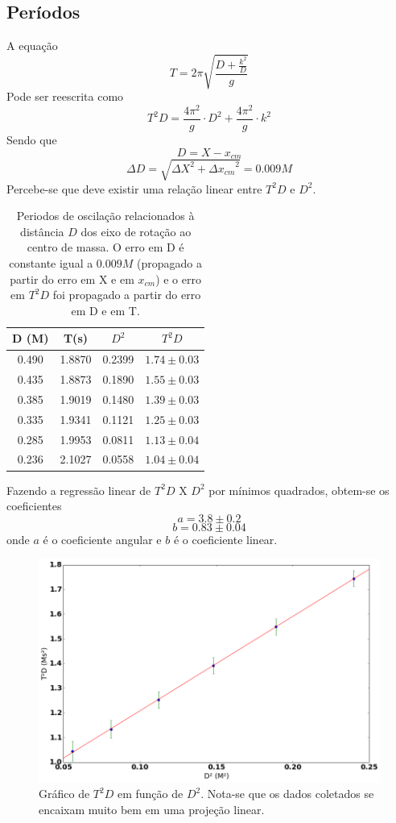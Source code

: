 \documentclass[12pt,a4paper]{article}
\begin{document}
\subsection{Períodos}
A equação $$ T = 2\pi\sqrt{\frac{D + \frac{k^2}{D}}{g}} $$ 
Pode ser reescrita como 
\begin{equation} \label{eq:funcao}
 T^2D = \frac{4\pi^2}{g} \cdot D^2 + \frac{4\pi^2}{g} \cdot k^2 
\end{equation}
Sendo que $$D = X - x_{cm} $$ 
$$ \Delta D = \sqrt{{\Delta X}^2 + {\Delta x_{cm}}^2}  = 0.009M$$
Percebe-se que deve existir uma relação linear entre $T^2D$ e $D^2$.
\newpage


  
\begin{table}[!htbp]
\def\arraystretch{1.5}
\begin{tabular}{|c|c|c|c|}
\hline
D (M)& T(s) & $D^2$ & $T^2D$ \\
\hline
0.490 & 1.8870 & 0.2399 & $1.74 \pm 0.03$\\
\hline
0.435 & 1.8873 & 0.1890 & $1.55 \pm 0.03$\\
\hline
0.385 & 1.9019 & 0.1480 & $1.39 \pm 0.03$\\
\hline
0.335 & 1.9341 & 0.1121 & $1.25 \pm 0.03$\\
\hline
0.285 & 1.9953 & 0.0811 & $1.13 \pm 0.04$\\
\hline
0.236 & 2.1027 & 0.0558 & $1.04 \pm 0.04$\\
\hline
\end{tabular} 


\caption{Periodos de oscilação relacionados à distância $D$ dos eixo de rotação ao centro de massa. O erro em D é constante igual a $0.009 M$ (propagado a partir do erro em X e em $x_{cm}$) e o erro em $T^2D$ foi propagado a partir do erro em D e em T.}
\end{table}
Fazendo a regressão linear de $T^2D$ X $D^2$ por mínimos quadrados, obtem-se os coeficientes $$ a = 3.8 \pm 0.2 $$  $$ b = 0.83 \pm 0.04 $$ onde $a$ é o coeficiente angular e $b$ é o coeficiente linear.

\begin{figure}[!hbtbp]
\caption{Gráfico de $T^2D$ em função de $D^2$. Nota-se que os dados coletados se encaixam muito bem em uma projeção linear.}
\includegraphics[scale=0.55]{index.png} 

\end{figure}
\end{document}
